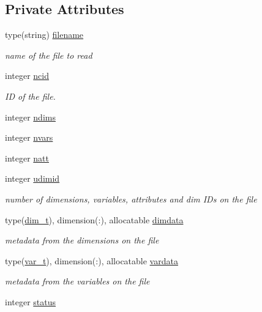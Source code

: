 \subsection*{Private Attributes}
\begin{DoxyCompactItemize}
\item 
type(string) \mbox{\hyperlink{structnetcdfparser__mod_1_1ncfile__class_ae3784734e7d33f1c44284a489dc18b8e}{filename}}
\begin{DoxyCompactList}\small\item\em name of the file to read \end{DoxyCompactList}\item 
integer \mbox{\hyperlink{structnetcdfparser__mod_1_1ncfile__class_aebae7955a6afd3914e32076d4e60b28d}{ncid}}
\begin{DoxyCompactList}\small\item\em ID of the file. \end{DoxyCompactList}\item 
integer \mbox{\hyperlink{structnetcdfparser__mod_1_1ncfile__class_a0edd626e9b8aa88287846fdba796df6b}{ndims}}
\item 
integer \mbox{\hyperlink{structnetcdfparser__mod_1_1ncfile__class_a108ff95589ac0afa4a3ebcfdd178c4f8}{nvars}}
\item 
integer \mbox{\hyperlink{structnetcdfparser__mod_1_1ncfile__class_a79568f0aae456c7a278c44a767a7be11}{natt}}
\item 
integer \mbox{\hyperlink{structnetcdfparser__mod_1_1ncfile__class_a4ecd4e68d99de349ac131df9572b5738}{udimid}}
\begin{DoxyCompactList}\small\item\em number of dimensions, variables, attributes and dim I\+Ds on the file \end{DoxyCompactList}\item 
type(\mbox{\hyperlink{structnetcdfparser__mod_1_1dim__t}{dim\+\_\+t}}), dimension(\+:), allocatable \mbox{\hyperlink{structnetcdfparser__mod_1_1ncfile__class_a4dd2f6e32f04a63ad8c3303d76dab84f}{dimdata}}
\begin{DoxyCompactList}\small\item\em metadata from the dimensions on the file \end{DoxyCompactList}\item 
type(\mbox{\hyperlink{structnetcdfparser__mod_1_1var__t}{var\+\_\+t}}), dimension(\+:), allocatable \mbox{\hyperlink{structnetcdfparser__mod_1_1ncfile__class_af4da1e5ae03037a7a8a8543713dcb8cd}{vardata}}
\begin{DoxyCompactList}\small\item\em metadata from the variables on the file \end{DoxyCompactList}\item 
integer \mbox{\hyperlink{structnetcdfparser__mod_1_1ncfile__class_ad5ca70c79d7fb287890f7c0cda5a222c}{status}}
\end{DoxyCompactItemize}


